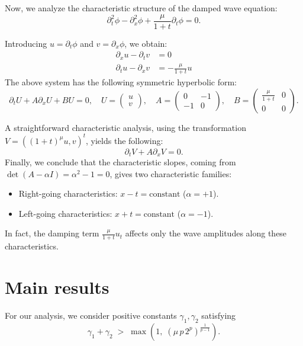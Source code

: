 \documentclass[
  sn-mathphys-num,
  colorlinks,
  linkcolor=darkmagenta,
  citecolor=rufous,
  urlcolor=zaffre,
  hypertexnames=false
]{sn-jnl}
\numberwithin{equation}{section}
\begin{document}
Now, we analyze the characteristic structure of the damped wave equation:
\begin{equation} \label{eq:main}
    \partial_t^2 \phi - \partial_x^2 \phi + \frac{\mu}{1 + t} \partial_t \phi = 0.
\end{equation}


Introducing $u = \partial_t \phi$ and $v = \partial_x \phi$, we obtain:
\begin{align}
    \partial_x u - \partial_t v &= 0 \label{eq:ux-vt} \\
    \partial_t u - \partial_x v &= -\frac{\mu}{1 + t} u \label{eq:system}
\end{align}
The above system has the following symmetric hyperbolic form:
\begin{equation} \label{eq:matrixform}
\partial_t U + A \partial_x U + B U = 0, \quad 
U = \begin{pmatrix} u \\ v \end{pmatrix}, \quad
A = \begin{pmatrix} 0 & -1 \\ -1 & 0 \end{pmatrix}, \quad
B = \begin{pmatrix} \frac{\mu}{1 + t} & 0 \\ 0 & 0 \end{pmatrix}.
\end{equation}

A straightforward characteristic analysis, using the transformation $V = \left((1+t)^\mu u, v \right)^t$, yields the following:
\begin{equation} \label{eq:transformed}
\partial_t V + A \partial_x V = 0.
\end{equation}
Finally, we conclude that the characteristic slopes, coming from $\det(A - \alpha I) = \alpha^2 - 1 = 0$, gives two characteristic families:
\begin{itemize}
    \item Right-going characteristics: $x - t = \text{constant}$ ($\alpha=+1$).
    \item Left-going characteristics: $x + t = \text{constant}$ ($\alpha=-1$).
\end{itemize}
In fact, the damping term $\frac{\mu}{1+t}u_t$ affects only the wave amplitudes along these characteristics.

\section{Main results}\label{sec3}
For our analysis, we consider positive constants $\gamma_1, \gamma_2$ satisfying
\begin{equation}
\label{condgam}
\gamma_1 + \gamma_2 \;>\; \max\!\left(1,\; (\mu\,p\,2^{p})^{\frac{1}{p-1}}\right).
\end{equation}
\end{document}
